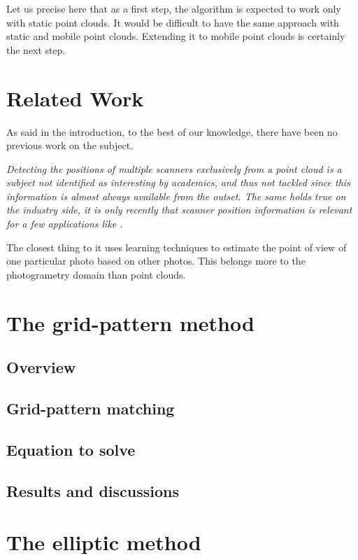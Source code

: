 Let us precise here that as a first step, the algorithm is expected to work only with static point clouds. It would be difficult to have the same approach with static and mobile point clouds. Extending it to mobile point clouds is certainly the next step.

\section{Related Work}
As said in the introduction, to the best of our knowledge, there have been no previous work on the subject.

\emph{Detecting the positions of multiple scanners exclusively from a point cloud is a subject not identified as interesting by academics, and thus not tackled since this information is almost always available from the outset. The same holds true on the industry side, it is only recently that scanner position information is relevant for a few applications like \CC.}

The closest thing to it uses learning techniques to estimate the point of view of one particular photo based on other photos. This belongs more to the photogrametry domain than point clouds.


\section{The grid-pattern method}


\subsection{Overview}


\subsection{Grid-pattern matching}


\subsection{Equation to solve}


\subsection{Results and discussions}



\section{The elliptic method}



